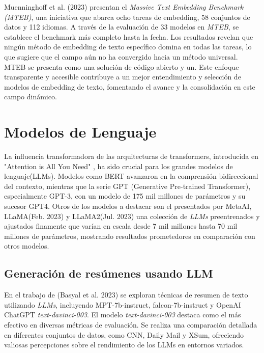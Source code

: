     Muenninghoff et al. (2023)\cite{muennighoff2023mteb} presentan el \emph{Massive Text Embedding Benchmark (MTEB)}, una iniciativa que abarca ocho tareas de embedding, 58 conjuntos de datos y 112 idiomas. A través de la evaluación de 33 modelos en \emph{MTEB}, se establece el benchmark más completo hasta la fecha. Los resultados revelan que ningún método de embedding de texto específico domina en todas las tareas, lo que sugiere que el campo aún no ha convergido hacia un método universal. MTEB se presenta como una solución de código abierto y un\cite[leaderboard público]{leaderboard}. Este enfoque transparente y accesible contribuye a un mejor entendimiento y selección de modelos de embedding de texto, fomentando el avance y la consolidación en este campo dinámico.

\section{Modelos de Lenguaje}
   
    La influencia transformadora de las arquitecturas de transformers, introducida en "Attention is All You Need" \cite{attention}, ha sido crucial para los grandes modelos de lenguaje(LLMs). Modelos como BERT\cite{BERT} avanzaron en la comprensión bidireccional del contexto, mientras que la serie GPT (Generative Pre-trained Transformer), especialmente GPT-3\cite{brown2020language}, con un modelo de 175 mil millones de parámetros y su sucesor GPT4\cite{openai2023gpt4}. Otros de los modelos a destacar son el presentados por MetaAI, LLaMA(Feb. 2023)\cite{llamapaper} y LLaMA2(Jul. 2023)\cite{llamapaper2} una colección de \emph{LLMs} preentrenados y ajustados finamente que varían en escala desde 7 mil millones hasta 70 mil millones de parámetros, mostrando resultados prometedores en comparación con otros modelos\cite{metallama}. 
    
    \subsection{Generación de resúmenes usando LLM}

    En el trabajo de (Basyal et al. 2023)\cite{basyal2023text} se exploran técnicas de resumen de texto utilizando \emph{LLMs}, incluyendo MPT-7b-instruct\cite{mpt}, falcon-7b-instruct\cite{falcon} y OpenAI ChatGPT \emph{text-davinci-003}\cite{brown2020language}. El modelo \emph{text-davinci-003} destaca como el más efectivo en diversas métricas de evaluación. Se realiza una comparación detallada en diferentes conjuntos de datos, como CNN, Daily Mail y XSum, ofreciendo valiosas percepciones sobre el rendimiento de los LLMs en entornos variados. 

